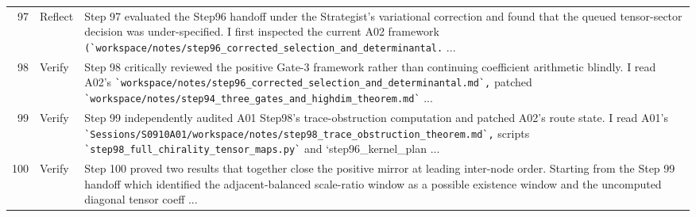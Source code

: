 \documentclass[UTF8,fontset=fandol,zihao=-4]{ctexart}
\begin{document}
\begin{longtable}{r p{} >{\raggedright\arraybackslash}p{}}
97 & Reflect & Step 97 evaluated the Step96 handoff under the Strategist's variational correction and found that the queued tensor-sector decision was under-specified. I first inspected the current A02 framework \nolinkurl{(`workspace/notes/step96_corrected_selection_and_determinantal.} ...\\
98 & Verify & Step 98 critically reviewed the positive Gate-3 framework rather than continuing coefficient arithmetic blindly. I read A02's \nolinkurl{`workspace/notes/step96_corrected_selection_and_determinantal.md`,} patched \nolinkurl{`workspace/notes/step94_three_gates_and_highdim_theorem.md`} ...\\
99 & Verify & Step 99 independently audited A01 Step98's trace-obstruction computation and patched A02's route state. I read A01's \nolinkurl{`Sessions/S0910A01/workspace/notes/step98_trace_obstruction_theorem.md`,} scripts \nolinkurl{`step98_full_chirality_tensor_maps.py`} and `step96\_kernel\_plan ...\\
100 & Verify & Step 100 proved two results that together close the positive mirror at leading inter-node order. Starting from the Step 99 handoff which identified the adjacent-balanced scale-ratio window as a possible existence window and the uncomputed diagonal tensor coeff ...\\
\bottomrule\end{longtable}
\normalfont\normalsize
\end{document}
